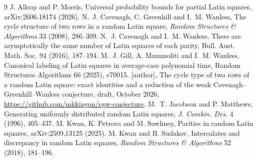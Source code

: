 \documentclass[11pt]{article}
\theoremstyle{remark}
\begin{document}
\begin{thebibliography}{9}
 J. Allsop and P. Morris, Universal probability bounds for partial Latin squares,
arXiv:2606.18174 (2026).
 N.~J. Cavenagh, C. Greenhill and I.~M. Wanless, The cycle
structure of two rows in a random Latin square, \emph{Random Structures
\& Algorithms} 33 (2008), 286--309.
 N.~J. Cavenagh and I.~M. Wanless, There are asymptotically the same number of
Latin squares of each parity, Bull. Aust. Math. Soc. 94 (2016), 187--194.
 M.~J. Gill, A. Mammoliti and I.~M. Wanless, Canonical labeling of Latin
squares in average-case polynomial time, Random Structures Algorithms 66 (2025), e70015.
 [author], The cycle type of two rows of a random Latin square: exact identities and a reduction of the weak Cavenagh--Greenhill--Wanless conjecture, draft, October 2026, \url{https://github.com/mkkinyon/cgw-conjecture}.
 M.~T. Jacobson and P. Matthews, Generating uniformly distributed random Latin squares, \emph{J. Combin. Des.} 4 (1996), 405--437.
 M. Kwan, K. Petrova and M. Sawhney, Parities in random Latin squares,
arXiv:2509.13125 (2025).
 M. Kwan and B. Sudakov, Intercalates and discrepancy in random Latin squares,
\emph{Random Structures \& Algorithms} 52 (2018), 181--196.
\end{thebibliography}
\end{document}
